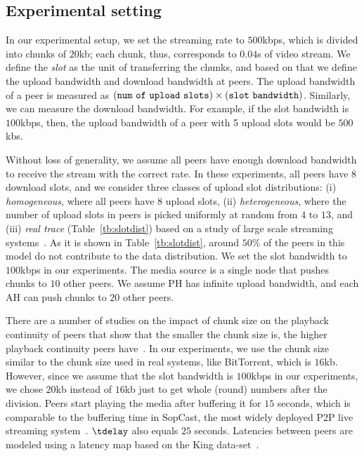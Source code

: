 \subsection{Experimental setting}

In our experimental setup, we set the streaming rate to $500$kbps, which is divided into chunks of $20$kb; each chunk, thus, corresponds to $0.04$s of video stream. We define the {\em slot} as the unit of transferring the chunks, and based on that we define the upload bandwidth and download bandwidth at peers. The upload bandwidth of a peer is measured as ${\tt (num\ of\ upload\ slots) \times (slot\ bandwidth)}$. Similarly, we can measure the download bandwidth. For example, if the slot bandwidth is $100$kbps, then, the upload bandwidth of a peer with 5 upload slots would be $500$kbs.

Without loss of generality, we assume all
peers have enough download bandwidth to receive the stream with the correct
rate. In these experiments, all peers have $8$ download slots, and we consider
three classes of upload slot distributions: (i) {\em homogeneous}, where all
peers have $8$ upload slots, (ii) {\em heterogeneous}, where the number of
upload slots in peers is picked uniformly at random from $4$ to $13$, and
(iii) {\em real trace} (Table~\ref{tb:slotdist}) based on a study of large
scale streaming systems~\cite{Sripanidkulchai}. As it is shown in
Table~\ref{tb:slotdist}, around $50$\% of the peers in this model do not
contribute to the data distribution. We set the slot bandwidth to $100$kbps in our experiments. The media source is a single node that
pushes chunks to $10$ other peers. We assume PH has infinite upload bandwidth,
and each AH can push chunks to $20$ other peers. 

There are a number of studies on the impact of chunk size on the playback continuity of peers that show that the smaller the chunk size is, the higher playback continuity peers have~\cite{sepidar,newcoolstreaming}. In our experiments, we use the chunk size similar to the chunk size used in real systems, like BitTorrent, which is $16$kb. However, since we assume that the slot bandwidth is $100$kbps in our experiments, we chose $20$kb instead of $16$kb just to get whole (round) numbers after the division. Peers start playing the media after buffering it for $15$ seconds, which is comparable to the buffering time in SopCast, the most widely deployed P2P live streaming system~\cite{sopcast,fallica2008quality}. $\tdelay$ also equals $25$ seconds. Latencies between peers are modeled using a latency map based on the King data-set~\cite{king}.

